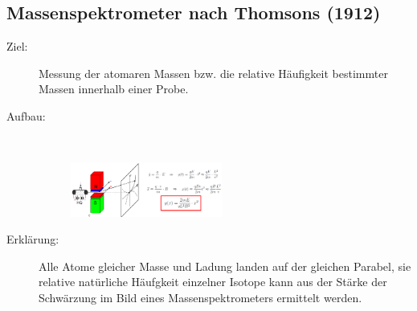 \documentclass[twocolumn]{summery_4.1}
\begin{document}
\subsection{Massenspektrometer nach Thomsons (1912)}
\begin{description}
    \item[Ziel:] Messung der atomaren Massen bzw. die relative Häufigkeit bestimmter Massen innerhalb einer Probe.
    
    \item[Aufbau:]\,

    \begin{figure}[H]
        \centering
        \includegraphics[width=0.49\textwidth]{massenspektrometer_nach_thomson.png}
    \end{figure}
    
    \item[Erklärung:]
    Alle Atome gleicher Masse und Ladung landen auf der gleichen Parabel, sie relative natürliche Häufgkeit einzelner Isotope kann aus der Stärke der Schwärzung im Bild eines Massenspektrometers ermittelt werden.
\end{description}
\end{document}
